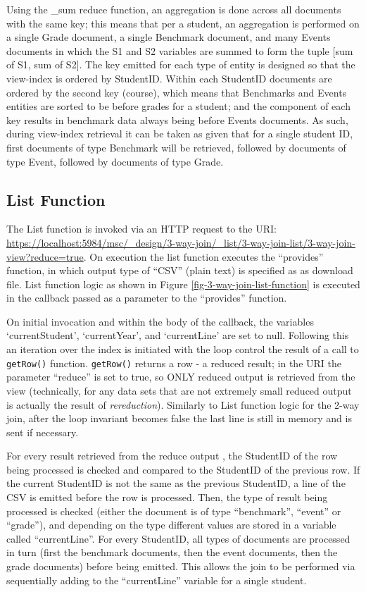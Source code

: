 Using the \_sum reduce function, an aggregation is done across all documents with the same key; this means that per a student, an aggregation is performed on a single Grade document, a single Benchmark document, and many Events documents in which the S1 and S2 variables are summed to form the tuple [sum of S1, sum of S2]. The key emitted for each type of entity is designed so that the view-index is ordered by StudentID. Within each StudentID documents are ordered by the second key (course), which means that Benchmarks and Events entities are sorted to be before grades for a student; and the  component of each key results in benchmark data always being before Events documents. As such, during view-index retrieval it can be taken as given that for a single student ID, first documents of type Benchmark will be retrieved, followed by documents of type Event, followed by documents of type Grade.



\subsection{List Function}
The List function is invoked via an HTTP request to the URI: \url{https://localhost:5984/msc/\_design/3-way-join/\_list/3-way-join-list/3-way-join-view?reduce=true}. On execution the list function executes the ``provides'' function, in which output type of ``CSV'' (plain text) is specified as as download file. List function logic as shown in Figure \ref{fig-3-way-join-list-function} is executed in the callback passed as a parameter to the ``provides'' function.

On initial invocation and within the body of the callback, the variables `currentStudent', `currentYear', and `currentLine' are set to null. Following this an iteration over the index is initiated with the loop control the result of a call to \texttt{getRow()} function. \texttt{getRow()} returns a row - a reduced result; in the URI the parameter ``reduce'' is set to true, so ONLY reduced output is retrieved from the view (technically, for any data sets that are not extremely small reduced output is actually the result of \textit{rereduction}). Similarly to List function logic for the 2-way join, after the loop invariant becomes false the last line is still in memory and is sent if necessary.

For every result retrieved from the reduce output , the StudentID of the row being processed is checked and compared to the StudentID of the previous row. If the current StudentID is not the same as the previous StudentID, a line of the CSV is emitted before the row is processed. Then, the type of result being processed is checked (either the document is of type ``benchmark'', ``event'' or ``grade''), and depending on the type different values are stored in a variable called ``currentLine''. For every StudentID, all types of documents are processed in turn (first the benchmark documents, then the event documents, then the grade documents) before being emitted. This allows the join to be performed via sequentially adding to the ``currentLine'' variable for a single student.

